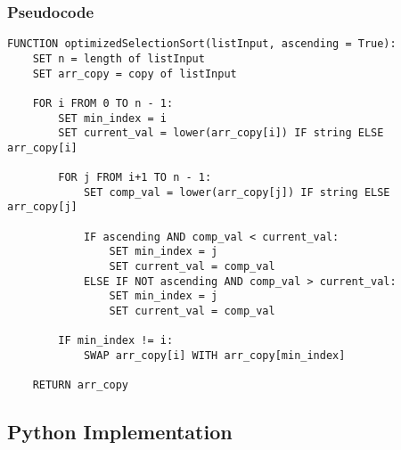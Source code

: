\documentclass{article}
\begin{document}
\subsubsection*{Pseudocode}
\begin{lstlisting}
FUNCTION optimizedSelectionSort(listInput, ascending = True):
    SET n = length of listInput
    SET arr_copy = copy of listInput

    FOR i FROM 0 TO n - 1:
        SET min_index = i
        SET current_val = lower(arr_copy[i]) IF string ELSE arr_copy[i]

        FOR j FROM i+1 TO n - 1:
            SET comp_val = lower(arr_copy[j]) IF string ELSE arr_copy[j]

            IF ascending AND comp_val < current_val:
                SET min_index = j
                SET current_val = comp_val
            ELSE IF NOT ascending AND comp_val > current_val:
                SET min_index = j
                SET current_val = comp_val

        IF min_index != i:
            SWAP arr_copy[i] WITH arr_copy[min_index]

    RETURN arr_copy
\end{lstlisting}

\subsection*{Python Implementation}
\end{document}
